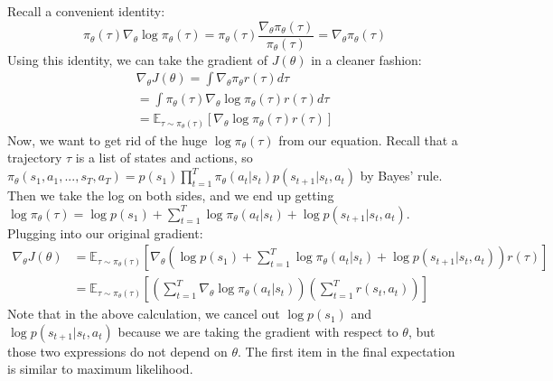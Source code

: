 Recall a convenient identity:
$$\pi_\theta(\tau)\nabla_\theta \log \pi_\theta(\tau) = \pi_\theta(\tau)\frac{\nabla_\theta \pi_\theta(\tau)}{\pi_\theta(\tau)}=\nabla_\theta \pi_\theta (\tau)$$
Using this identity, we can take the gradient of $J(\theta)$ in a cleaner fashion:
\begin{align*}
\nabla_\theta J(\theta) = \int \nabla_\theta \pi_\theta r(\tau)d\tau\\
=\int\pi_\theta(\tau)\nabla_\theta \log \pi_\theta(\tau) r(\tau) d\tau\\
= \mathbb{E}_{\tau\sim \pi_\theta(\tau)}[\nabla_\theta \log \pi_\theta (\tau)r(\tau)]
\end{align*}
Now, we want to get rid of the huge $\log \pi_\theta(\tau)$ from our equation. Recall that a trajectory $\tau$ is a list of states and actions, so $\pi_\theta(s_1,a_1,...,s_T,a_T) = p(s_1)\prod_{t=1}^T\pi_\theta (a_t|s_t)p(s_{t+1}|s_t,a_t)$ by Bayes' rule. Then we take the log on both sides, and we end up getting $\log\pi_\theta(\tau) = \log p(s_1) + \sum_{t=1}^T \log\pi_\theta(a_t|s_t)+\log p(s_{t+1}|s_t,a_t)$.
Plugging into our original gradient:
\begin{equation}
\begin{aligned}
    \nabla_\theta J(\theta) &= \mathbb{E}_{\tau\sim \pi_\theta(\tau)}\left[\nabla_\theta\left(\log p(s_1) + \sum_{t=1}^T \log \pi_\theta(a_t|s_t)+\log p(s_{t+1}|s_t,a_t)\right)r(\tau)\right]\\
    &= \mathbb{E}_{\tau\sim \pi_\theta(\tau)}\left[ \left(\sum_{t=1}^T\nabla_\theta \log\pi_\theta(a_t|s_t)\right)\left(\sum_{t=1}^T r(s_t,a_t)\right)\right]
\end{aligned}
\end{equation}
Note that in the above calculation, we cancel out $\log p(s_1)$ and $\log p(s_{t+1}|s_t,a_t)$ because we are taking the gradient with respect to $\theta$, but those two expressions do not depend on $\theta$. The first item in the final expectation is similar to maximum likelihood.
